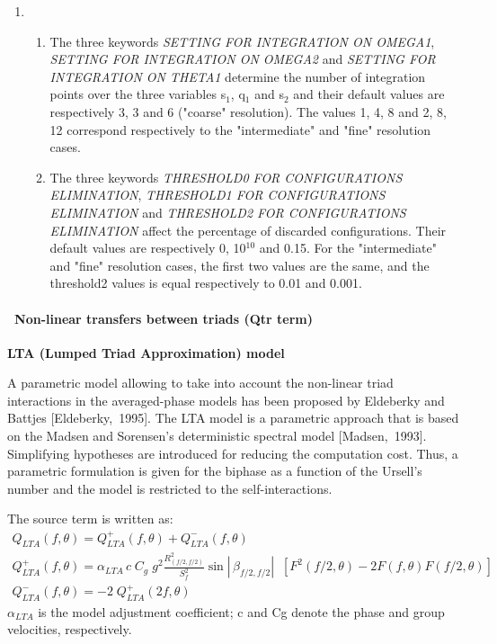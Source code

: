 \begin{enumerate}
\item \begin{enumerate}
\item  The three keywords \textit{SETTING FOR INTEGRATION ON OMEGA1}, \textit{SETTING FOR INTEGRATION ON OMEGA2} and \textit{SETTING FOR INTEGRATION ON THETA1} determine the number of integration points over the three variables s${}_{1}$, q${}_{1}$ and s${}_{2}$ and their default values are respectively 3, 3 and 6 ("coarse" resolution). The values 1, 4, 8 and 2, 8, 12 correspond respectively to the "intermediate" and "fine" resolution cases.

\item  The three keywords \textit{THRESHOLD0 FOR CONFIGURATIONS ELIMINATION}, \textit{THRESHOLD1 FOR CONFIGURATIONS ELIMINATION} and \textit{THRESHOLD2 FOR CONFIGURATIONS ELIMINATION} affect the percentage of discarded configurations. Their default values are respectively 0, 10${}^{10}$ and 0.15. For the "intermediate" and "fine" resolution cases, the first two values are the same, and the threshold2 values is equal respectively to 0.01 and 0.001.
\end{enumerate}
\end{enumerate}


\paragraph{ ~Non-linear transfers between triads (Qtr term)}


{\bf  LTA (Lumped Triad Approximation) model}

 A parametric model allowing to take into account the non-linear triad interactions in the averaged-phase models has been proposed by Eldeberky and Battjes [Eldeberky,~1995]. The LTA model is a parametric approach that is based on the Madsen and Sorensen's deterministic spectral model [Madsen,~1993]. Simplifying hypotheses are introduced for reducing the computation cost. Thus, a parametric formulation is given for the biphase as a function of the Ursell's number and the model is restricted to the self-interactions.

 The source term is written as:
\begin{equation} \label{GrindEQ__4_63_}
\begin{array}{l} {Q_{LTA} (f,\theta )=Q_{LTA}^{+} (f,\theta )+Q_{LTA}^{-} (f,\theta )} \\ {Q_{LTA}^{+} (f,\theta )=\alpha _{LTA} \, c\; C_{g} \; g^{2} \frac{R_{(f/2,f/2)}^{2} }{S_{f}^{2} } \sin \left|\, \beta _{f/2,f/2} \right|\; \; \left[F^{2} (f/2,\theta )-2F(f,\theta )F(f/2,\theta )\right]} \\ {Q_{LTA}^{-} (f,\theta )=-2\; Q_{LTA}^{+} (2f,\theta )} \end{array}
\end{equation}
$\alpha _{LTA} $ is the model adjustment coefficient; c and Cg denote the phase and group velocities, respectively.

